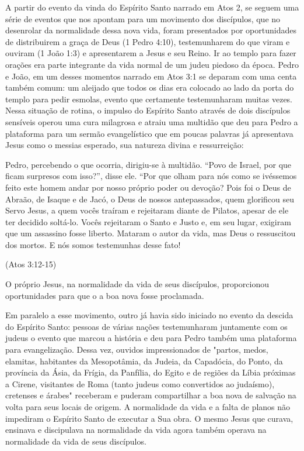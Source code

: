 \documentclass[
	12pt,				%
	openright,			%
	twoside,			%
	a4paper,			%
	english,			%
	french,				%
	spanish,			%
	brazil				%
	]{abntex2}
\begin{document}
A partir do evento da vinda do Espírito Santo narrado em Atos 2, se seguem uma série de eventos que nos apontam para um movimento dos discípulos, que no desenrolar da normalidade dessa nova vida, foram presentados por oportunidades de distribuirem a graça de Deus (1 Pedro 4:10), testemunharem do que viram e ouviram (1 João 1:3) e apresentarem a Jesus e seu Reino. Ir ao templo para fazer orações era parte integrante da vida normal de um judeu piedoso da época. Pedro e João, em um desses momentos narrado em Atos 3:1 se deparam com uma centa também comum: um aleijado que todos os dias era colocado ao lado da porta do templo para pedir esmolas, evento que certamente testemunharam muitas vezes. Nessa situação de rotina, o impulso do Espírito Santo através de dois discípulos sensíveis operou uma cura milagrosa e atraiu uma multidão que deu para Pedro a plataforma para um sermão evangelístico que em poucas palavras já apresentava Jesus como o messias esperado, sua natureza divina e ressurreição:

\begin{citacao}
	Pedro, percebendo o que ocorria, dirigiu-se à multidão. “Povo de Israel, por que ficam surpresos com isso?”, disse ele. “Por que olham para nós como se ivéssemos feito este homem andar por nosso próprio poder ou devoção? Pois foi o Deus de Abraão, de Isaque e de Jacó, o Deus de nossos antepassados, quem glorificou seu Servo Jesus, a quem vocês traíram e rejeitaram diante de Pilatos,
	apesar de ele ter decidido soltá-lo. Vocês rejeitaram o Santo e Justo e, em seu lugar, exigiram que um assassino fosse liberto. Mataram o autor da vida, mas Deus o ressuscitou dos mortos. E nós somos testemunhas desse fato!
\end{citacao}(Atos 3:12-15)

O próprio Jesus, na normalidade da vida de seus discípulos, proporcionou oportunidades para que o a boa nova fosse proclamada. 

Em paralelo a esse movimento, outro já havia sido iniciado no evento da descida do Espírito Santo: pessoas de várias nações testemunharam juntamente com os judeus o evento que marcou a história e deu para Pedro também uma plataforma para evangelização. Dessa vez, ouvidos impressionados de "partos, medos, elamitas, habitantes da Mesopotâmia, da Judeia, da Capadócia, do Ponto, da província da Ásia, da Frígia, da Panfília, do Egito e de regiões da Líbia próximas a Cirene, visitantes de Roma (tanto judeus como convertidos ao judaísmo), cretenses e árabes" receberam e puderam compartilhar a boa nova de salvação na volta para seus locais de origem. A normalidade da vida e a falta de planos não impediram o Espírito Santo de executar a Sua obra. O mesmo Jesus que curava, ensinava e discipulava na normalidade da vida agora também operava na normalidade da vida de seus discípulos.
\end{document}
